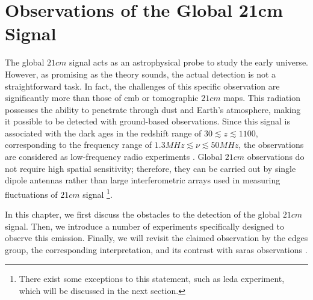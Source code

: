 \documentclass[12pt, TexShade, letterpaper]{report}
\begin{document}
\chapter{Observations of the Global 21cm Signal}
\label{chap:observations}
The global $21cm$ signal acts as an astrophysical probe to study the early universe. However, as promising as the theory sounds, the actual detection is not a straightforward task. In fact, the challenges of this specific observation are significantly more than those of \gls{cmb} or tomographic $21cm$ maps. 
This radiation possesses the ability to penetrate through dust and Earth's atmosphere, making it possible to be detected with ground-based observations. Since this signal is associated with the dark ages in the redshift range of $30 \lesssim z \lesssim 1100$, corresponding to the frequency range of $1.3 MHz\lesssim \nu \lesssim 50 MHz$, the observations are considered as low-frequency radio experiments \cite{thesis_pamela, thesis_moso}.
Global $21cm$ observations do not require high spatial sensitivity; therefore, they can be carried out by single dipole antennas rather than large interferometric arrays used in measuring fluctuations of $21cm$ signal \cite{thesis_shedding} \footnote{There exist some exceptions to this statement, such as \gls{leda} experiment, which will be discussed in the next section.}.\par
In this chapter, we first discuss the obstacles to the detection of the global $21cm$ signal. Then, we introduce a number of experiments specifically designed to observe this emission. Finally, we will revisit the claimed observation by the \gls{edges} group, the corresponding interpretation, and its contrast with \gls{saras} observations \cite{saras_curse_edges}.
\end{document}
